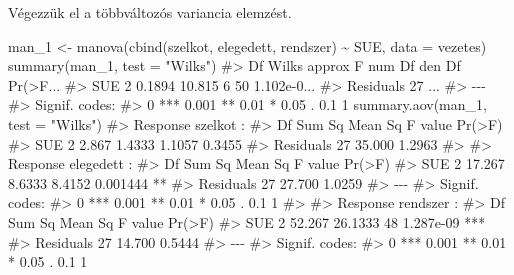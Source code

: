 \documentclass[
  letterpaper,
]{krantz}
\makeatletter
\newenvironment{Shaded}{\begin{snugshade}}{\end{snugshade}}
\newcommand{\AttributeTok}[1]{\textcolor[rgb]{0.40,0.45,0.13}{#1}}
\newcommand{\CommentTok}[1]{\textcolor[rgb]{0.37,0.37,0.37}{#1}}
\newcommand{\FunctionTok}[1]{\textcolor[rgb]{0.28,0.35,0.67}{#1}}
\newcommand{\NormalTok}[1]{\textcolor[rgb]{0.00,0.23,0.31}{#1}}
\newcommand{\OtherTok}[1]{\textcolor[rgb]{0.00,0.23,0.31}{#1}}
\newcommand{\SpecialCharTok}[1]{\textcolor[rgb]{0.37,0.37,0.37}{#1}}
\newcommand{\StringTok}[1]{\textcolor[rgb]{0.13,0.47,0.30}{#1}}
\newenvironment{kframe}{%
\medskip{}
\setlength{\fboxsep}{.8em}
 \def\at@end@of@kframe{}%
 \ifinner\ifhmode%
  \def\at@end@of@kframe{\end{minipage}}%
  \begin{minipage}{\columnwidth}%
 \fi\fi%
 \def\FrameCommand##1{\hskip\@totalleftmargin \hskip-\fboxsep
 \colorbox{shadecolor}{##1}\hskip-\fboxsep
     \hskip-\linewidth \hskip-\@totalleftmargin \hskip\columnwidth}%
 \MakeFramed {\advance\hsize-\width
   \@totalleftmargin\z@ \linewidth\hsize
   \@setminipage}}%
 {\par\unskip\endMakeFramed%
 \at@end@of@kframe}
\renewenvironment{Shaded}{\begin{kframe}}{\end{kframe}}
\makeatother
\begin{document}
Végezzük el a többváltozós variancia elemzést.

\begin{Shaded}
\begin{Highlighting}[]
\NormalTok{man\_1 }\OtherTok{\textless{}{-}} \FunctionTok{manova}\NormalTok{(}\FunctionTok{cbind}\NormalTok{(szelkot, elegedett, rendszer) }\SpecialCharTok{\textasciitilde{}}\NormalTok{ SUE, }\AttributeTok{data =}\NormalTok{ vezetes)}
\FunctionTok{summary}\NormalTok{(man\_1, }\AttributeTok{test =} \StringTok{"Wilks"}\NormalTok{)}
\CommentTok{\#\textgreater{}           Df  Wilks approx F num Df den Df    Pr(\textgreater{}F...}
\CommentTok{\#\textgreater{} SUE        2 0.1894   10.815      6     50 1.102e{-}0...}
\CommentTok{\#\textgreater{} Residuals 27                                       ...}
\CommentTok{\#\textgreater{} {-}{-}{-}}
\CommentTok{\#\textgreater{} Signif. codes:  }
\CommentTok{\#\textgreater{} 0 \textquotesingle{}***\textquotesingle{} 0.001 \textquotesingle{}**\textquotesingle{} 0.01 \textquotesingle{}*\textquotesingle{} 0.05 \textquotesingle{}.\textquotesingle{} 0.1 \textquotesingle{} \textquotesingle{} 1}
\FunctionTok{summary.aov}\NormalTok{(man\_1, }\AttributeTok{test =} \StringTok{"Wilks"}\NormalTok{)}
\CommentTok{\#\textgreater{}  Response szelkot :}
\CommentTok{\#\textgreater{}             Df Sum Sq Mean Sq F value Pr(\textgreater{}F)}
\CommentTok{\#\textgreater{} SUE          2  2.867  1.4333  1.1057 0.3455}
\CommentTok{\#\textgreater{} Residuals   27 35.000  1.2963               }
\CommentTok{\#\textgreater{} }
\CommentTok{\#\textgreater{}  Response elegedett :}
\CommentTok{\#\textgreater{}             Df Sum Sq Mean Sq F value   Pr(\textgreater{}F)   }
\CommentTok{\#\textgreater{} SUE          2 17.267  8.6333  8.4152 0.001444 **}
\CommentTok{\#\textgreater{} Residuals   27 27.700  1.0259                    }
\CommentTok{\#\textgreater{} {-}{-}{-}}
\CommentTok{\#\textgreater{} Signif. codes:  }
\CommentTok{\#\textgreater{} 0 \textquotesingle{}***\textquotesingle{} 0.001 \textquotesingle{}**\textquotesingle{} 0.01 \textquotesingle{}*\textquotesingle{} 0.05 \textquotesingle{}.\textquotesingle{} 0.1 \textquotesingle{} \textquotesingle{} 1}
\CommentTok{\#\textgreater{} }
\CommentTok{\#\textgreater{}  Response rendszer :}
\CommentTok{\#\textgreater{}             Df Sum Sq Mean Sq F value    Pr(\textgreater{}F)    }
\CommentTok{\#\textgreater{} SUE          2 52.267 26.1333      48 1.287e{-}09 ***}
\CommentTok{\#\textgreater{} Residuals   27 14.700  0.5444                      }
\CommentTok{\#\textgreater{} {-}{-}{-}}
\CommentTok{\#\textgreater{} Signif. codes:  }
\CommentTok{\#\textgreater{} 0 \textquotesingle{}***\textquotesingle{} 0.001 \textquotesingle{}**\textquotesingle{} 0.01 \textquotesingle{}*\textquotesingle{} 0.05 \textquotesingle{}.\textquotesingle{} 0.1 \textquotesingle{} \textquotesingle{} 1}


\end{Highlighting}
\end{Shaded}
\end{document}
